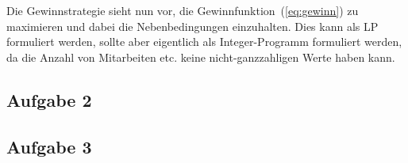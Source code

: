 \documentclass[11pt,a4paper,ngerman]{article}
\begin{document}
Die Gewinnstrategie sieht nun vor, die Gewinnfunktion~(\ref{eq:gewinn}) zu maximieren
und dabei die Nebenbedingungen einzuhalten. Dies kann als LP formuliert werden, sollte aber
eigentlich als Integer-Programm formuliert werden, da die Anzahl von Mitarbeiten etc. keine
nicht-ganzzahligen Werte haben kann.
\subsection*{Aufgabe 2}

\subsection*{Aufgabe 3}




\label{LastPage}
\end{document}
